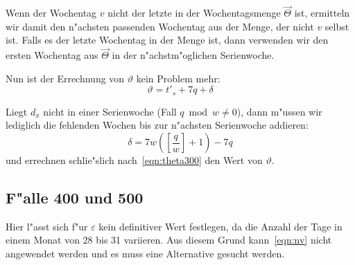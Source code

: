 \documentclass[a4paper]{article}
\numberwithin{equation}{section}
\begin{document}
\noindent Wenn der Wochentag $v$ nicht der letzte in der Wochentagsmenge
$\vec{\Theta}$ ist, ermitteln wir damit den n"achsten passenden Wochentag aus
der Menge, der nicht $v$ selbst ist. Falls es der letzte Wochentag in der Menge
ist, dann verwenden wir den ersten Wochentag aus $\vec{\Theta}$ in der
n"achstm"oglichen Serienwoche.

Nun ist der Errechnung von $\vartheta$ kein Problem mehr:
\begin{equation}
\label{eqn:theta300}\vartheta = t'_s + 7q + \delta
\end{equation}

\noindent Liegt $d_x$ nicht in einer Serienwoche (Fall $q \bmod w \ne 0$), dann
m"ussen wir lediglich die fehlenden Wochen bis zur n"achsten Serienwoche
addieren:
\begin{equation}\delta = 7w(\left[\frac{q}{w}\right] + 1) - 7q\end{equation}
und errechnen schlie"slich nach~\eqref{eqn:theta300} den Wert von $\vartheta$.


%
%
\subsection{F"alle 400 und 500}\label{ssec:approx400_500}
Hier l"asst sich f"ur $\varepsilon$ kein definitiver Wert festlegen, da die
Anzahl der Tage in einem Monat von 28 bis 31 variieren. Aus diesem Grund
kann~\eqref{eqn:nv} nicht angewendet werden und es muss eine Alternative gesucht
werden.
\end{document}
